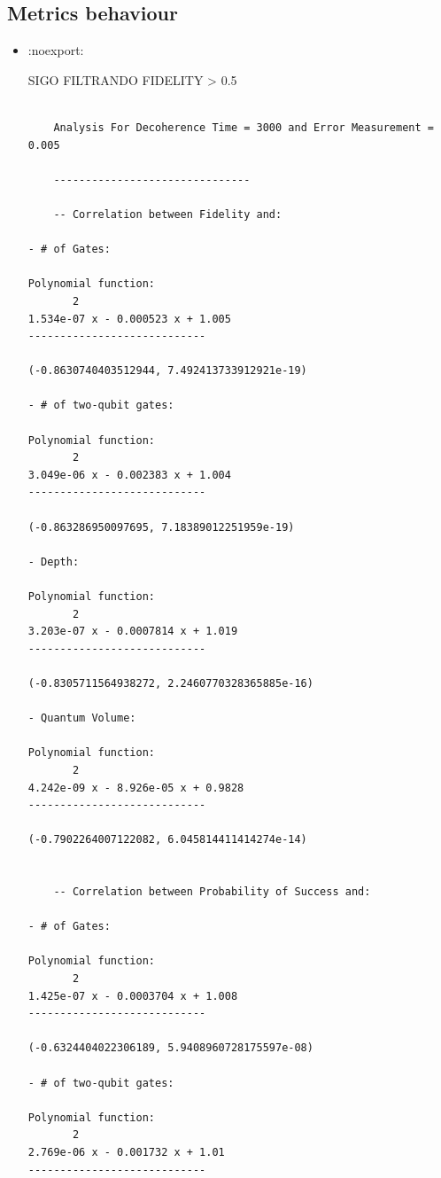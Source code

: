 \subsection*{Metrics behaviour}
\label{sec:orgb965b8d}




\begin{itemize}
\item :noexport:
\label{sec:org18e6dcf}

SIGO FILTRANDO FIDELITY > 0.5

\begin{verbatim}

	Analysis For Decoherence Time = 3000 and Error Measurement = 0.005

	-------------------------------

	-- Correlation between Fidelity and:

- # of Gates:

Polynomial function:
	   2
1.534e-07 x - 0.000523 x + 1.005
----------------------------

(-0.8630740403512944, 7.492413733912921e-19)

- # of two-qubit gates:

Polynomial function:
	   2
3.049e-06 x - 0.002383 x + 1.004
----------------------------

(-0.863286950097695, 7.18389012251959e-19)

- Depth:

Polynomial function:
	   2
3.203e-07 x - 0.0007814 x + 1.019
----------------------------

(-0.8305711564938272, 2.2460770328365885e-16)

- Quantum Volume:

Polynomial function:
	   2
4.242e-09 x - 8.926e-05 x + 0.9828
----------------------------

(-0.7902264007122082, 6.045814411414274e-14)


	-- Correlation between Probability of Success and:

- # of Gates:

Polynomial function:
	   2
1.425e-07 x - 0.0003704 x + 1.008
----------------------------

(-0.6324404022306189, 5.9408960728175597e-08)

- # of two-qubit gates:

Polynomial function:
	   2
2.769e-06 x - 0.001732 x + 1.01
----------------------------


\end{verbatim}
\end{itemize}
